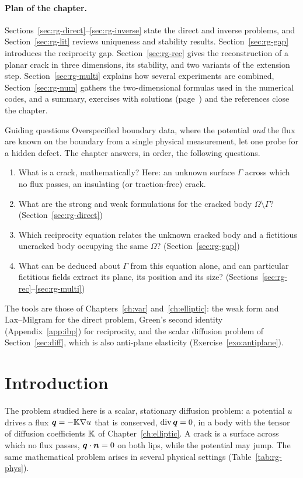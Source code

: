 \paragraph{Plan of the chapter.} Sections~\ref{sec:rg-direct}--\ref{sec:rg-inverse} state the direct and inverse problems, and Section~\ref{sec:rg-lit} reviews uniqueness and stability results. Section~\ref{sec:rg-gap} introduces the reciprocity gap. Section~\ref{sec:rg-rec} gives the reconstruction of a planar crack in three dimensions, its stability, and two variants of the extension step. Section~\ref{sec:rg-multi} explains how several experiments are combined, Section~\ref{sec:rg-num} gathers the two-dimensional formulas used in the numerical codes, and a summary, exercises with solutions (page~\pageref{sec:rg-exo}) and the references close the chapter.

\begin{gbox}{Guiding questions}
Overspecified boundary data, where the potential \emph{and} the flux are known
on the boundary from a single physical measurement, let one probe for a hidden
defect. The chapter answers, in order, the following questions.
\begin{enumerate}[itemsep=1pt]
  \item What is a crack, mathematically? Here: an unknown surface $\Gamma$
  across which no flux passes, an insulating (or traction-free) crack.
  \item What are the strong and weak formulations for the cracked body
  $\Omega\setminus\Gamma$? (Section~\ref{sec:rg-direct})
  \item Which reciprocity equation relates the unknown cracked body and a
  fictitious uncracked body occupying the same $\Omega$?
  (Section~\ref{sec:rg-gap})
  \item What can be deduced about $\Gamma$ from this equation alone, and can
  particular fictitious fields extract its plane, its position and its size?
  (Sections~\ref{sec:rg-rec}--\ref{sec:rg-multi})
\end{enumerate}
The tools are those of Chapters~\ref{ch:var} and~\ref{ch:elliptic}: the
weak form and Lax--Milgram for the direct problem, Green's second identity
(Appendix~\ref{app:ibp}) for reciprocity, and the scalar diffusion problem of
Section~\ref{sec:diff}, which is also anti-plane elasticity
(Exercise~\ref{exo:antiplane}).
\end{gbox}

\section{Introduction}\label{sec:rg-intro}
%
The problem studied here is a scalar, stationary diffusion problem: a potential $u$ drives a flux $\bm{q}=-\mathbb{K}\nabla u$ that is conserved, $\operatorname{div}\bm{q}=0$, in a body with the tensor of diffusion coefficients $\mathbb{K}$ of Chapter~\ref{ch:elliptic}. A crack is a surface across which no flux passes, $\bm{q}\cdot\bm{n}=0$ on both lips, while the potential may jump. The same mathematical problem arises in several physical settings (Table~\ref{tab:rg-phys}).

